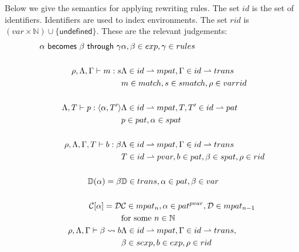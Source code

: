 Below we give the semantics for applying rewriting rules. The set $id$ is the
set of identifiers. Identifiers are used to index environments. The set $rid$ is
$(var \times \mathbb{N}) \cup \{\textsf{undefined}\}$. These are the relevant
judgements:
\begin{eqnarray*}[l@{\quad\quad\quad}l]
  \becomesthrough{\alpha}{\beta}{\gamma} &\alpha, \beta \in exp, \gamma
  \in rules\\
  \\
  \rho, \Lambda, \Gamma |- m : s & \Lambda \in id \rightharpoonup mpat, \Gamma \in id
  \rightharpoonup trans\\
  & m \in match, s \in smatch, \rho \in var rid\\
  \\
  \Lambda, T |- p : \langle \alpha, T' \rangle & \Lambda \in id \rightharpoonup
  mpat, T, T' \in id \rightharpoonup pat\\
  & p \in pat, \alpha \in spat\\
  \\
  \rho, \Lambda, \Gamma, T |- b : \beta & \Lambda \in id \rightharpoonup mpat,
  \Gamma \in id \rightharpoonup trans\\
  & T \in id \rightharpoonup pvar, b \in pat, \beta \in spat, \rho \in rid\\
  \\
  \mathbb{D}(\alpha) = \beta & \mathbb{D} \in trans, \alpha \in pat, \beta \in var\\
  \\
  \mathcal{C}[\alpha] = \mathcal{D} & \mathcal{C} \in mpat_n, \alpha \in
  pat^{pvar}, \mathcal{D} \in mpat_{n - 1}\\
  &\text{for some $n \in
    \mathbb{N}$}\\
  \rho, \Lambda, \Gamma |- \beta \leadsto b & \Lambda \in id \rightharpoonup mpat,
  \Gamma \in id \rightharpoonup trans,\\
  & \beta \in sexp, b \in exp, \rho \in rid\\
  \\
\end{eqnarray*}

